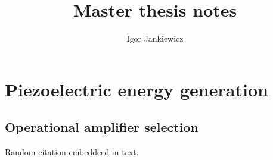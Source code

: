 \documentclass[10pt,a4paper,titlepage]{report}
\author{Igor Jankiewicz}
\title{Master thesis notes}
\begin{document}
\maketitle

\tableofcontents
\newpage
\thispagestyle{empty}
\chapter{Piezoelectric energy generation}

\section{Operational amplifier selection}

Random citation \cite[1]{DUMMY:1} embeddeed in text.

\newpage

 

\end{document}
